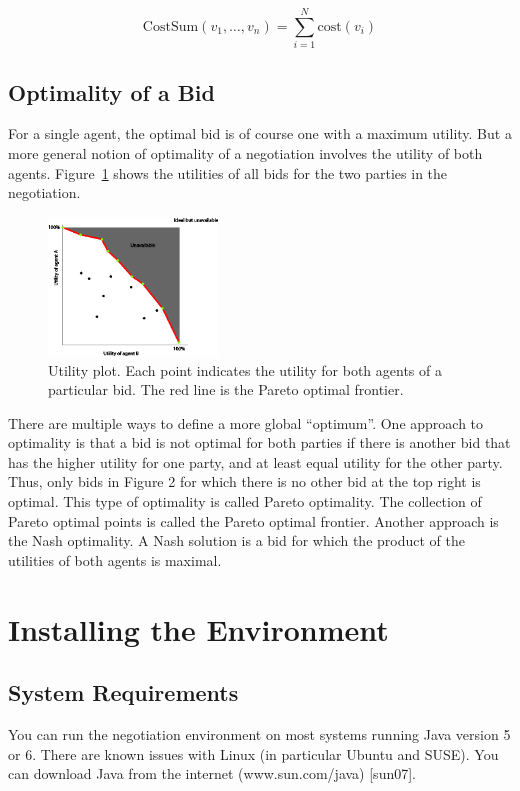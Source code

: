 \documentclass[]{article}
\begin{document}
\begin{equation}
	\text{CostSum}(v_1, \ldots, v_n) = \sum_{i=1}^{N} \text{cost}(v_i)
\end{equation}

\subsection{Optimality of a Bid}
For a single agent, the optimal bid is of course one with a maximum utility. But a more general notion of optimality of a negotiation involves the utility of both agents. Figure~\ref{Fig:utility plot} shows the utilities of all bids for the two parties in the negotiation. 
 
\begin{figure}[htb]
	\centering
	\includegraphics[width=0.4\textwidth]{media/image5.png}
\caption{Utility plot. Each point indicates the utility for both agents of a particular bid. The red line is the Pareto optimal frontier.}\label{Fig:utility plot}
\end{figure}

There are multiple ways to define a more global ``optimum''. One approach to optimality is that a bid is not optimal for both parties if there is another bid that has the higher utility for one party, and at least equal utility for the other party. Thus, only bids in Figure 2 for which there is no other bid at the top right is optimal. This type of optimality is called Pareto optimality. The collection of Pareto optimal points is called the Pareto optimal frontier. Another approach is the Nash optimality. A Nash solution is a bid for which the product of the utilities of both agents is maximal. 
 
\section{Installing the Environment}

\subsection{System Requirements}
You can run the negotiation environment on most systems running Java version 5 or 6. There are known issues with Linux (in particular Ubuntu and SUSE). You can download Java from the internet (www.sun.com/java) [sun07]. 
\end{document}
